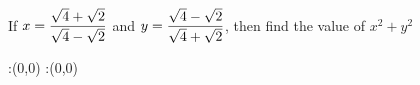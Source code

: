 

\question[2] If $x = \dfrac{\sqrt{4}+\sqrt{2}}{\sqrt{4}-\sqrt{2}}$
and $y = \dfrac{\sqrt{4}-\sqrt{2}}{\sqrt{4}+\sqrt{2}}$, then find
the value of $x^2+y^2$

\insertQR{}

\watchout

\ifprintanswers
  \begin{marginfigure}
      :(0,0)
      :(0,0)
    \figdrawbegin{}
      \figdrawline [100,101]
    \figdrawend
    \figvisu{\figBoxA}{}{%
    }
    \centerline{\box\figBoxA}
  \end{marginfigure}
\fi 

